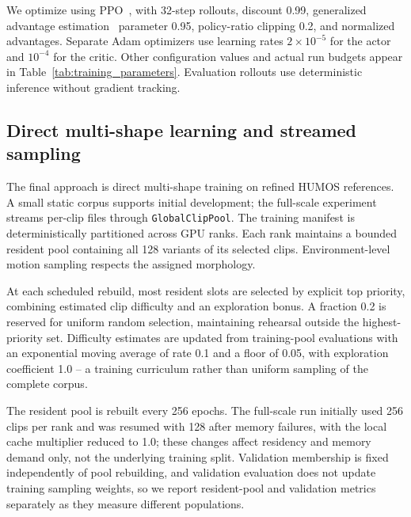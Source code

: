 We optimize using PPO~\cite{ppo}, with 32-step rollouts, discount 0.99,
generalized advantage estimation~\cite{gae} parameter 0.95, policy-ratio
clipping 0.2, and normalized advantages.
Separate Adam optimizers use learning rates $2\times10^{-5}$ for the actor
and $10^{-4}$ for the critic. Other configuration values and actual run
budgets appear in Table~\ref{tab:training_parameters}. Evaluation rollouts
use deterministic inference without gradient tracking.

\subsection{Direct multi-shape learning and streamed sampling}\label{sec:sampling}

The final approach is direct multi-shape training on refined HUMOS
references. A small static corpus supports initial development; the
full-scale experiment streams per-clip files through \texttt{GlobalClipPool}.
The training manifest is deterministically partitioned across GPU ranks.
Each rank maintains a bounded resident pool containing all 128 variants
of its selected clips. Environment-level motion sampling respects the
assigned morphology.

At each scheduled rebuild, most resident slots are selected by explicit
top priority, combining estimated clip difficulty and an exploration bonus.
A fraction 0.2 is reserved for uniform random selection, maintaining rehearsal
outside the highest-priority set. Difficulty estimates are updated from
training-pool evaluations with an exponential moving average of rate 0.1
and a floor of 0.05, with exploration coefficient 1.0 -- a training
curriculum rather than uniform sampling of the complete corpus.

The resident pool is rebuilt every 256 epochs. The full-scale run initially
used 256 clips per rank and was resumed with 128 after memory failures, with
the local cache multiplier reduced to 1.0; these changes affect residency
and memory demand only, not the underlying training split. Validation
membership is fixed independently of pool rebuilding, and validation
evaluation does not update training sampling weights, so we report
resident-pool and validation metrics separately as they measure different
populations.
